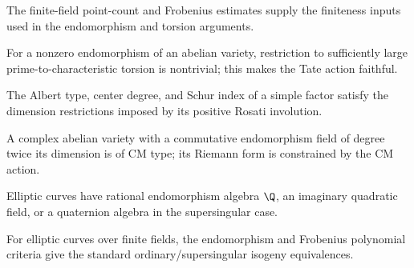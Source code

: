 \begin{theorem}
\label{mumford-iv21-lang-rational-point}
The finite-field point-count and Frobenius estimates supply the finiteness
inputs used in the endomorphism and torsion arguments.
\notready
\end{theorem}

\begin{theorem}
\label{mumford-iv21-serre-torsion-restriction}
For a nonzero endomorphism of an abelian variety, restriction to sufficiently
large prime-to-characteristic torsion is nontrivial; this makes the Tate action
faithful.
\notready
\end{theorem}

\begin{corollary}
\label{mumford-iv21-endomorphism-type-table}
The Albert type, center degree, and Schur index of a simple factor satisfy the
dimension restrictions imposed by its positive Rosati involution.
\notready
\end{corollary}

\begin{example}
\label{mumford-iv22-cm-complex-example}
A complex abelian variety with a commutative endomorphism field of degree twice
its dimension is of CM type; its Riemann form is constrained by the CM action.
\notready
\end{example}

\begin{example}
\label{mumford-iv22-elliptic-weierstrass-example}
Elliptic curves have rational endomorphism algebra $\Q$, an imaginary
quadratic field, or a quaternion algebra in the supersingular case.
\notready
\end{example}

\begin{theorem}
\label{mumford-iv22-deuring-equivalences}
For elliptic curves over finite fields, the endomorphism and Frobenius
polynomial criteria give the standard ordinary/supersingular isogeny
equivalences.
\notready
\end{theorem}

